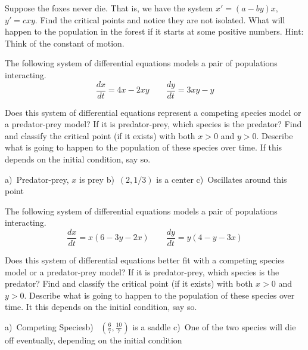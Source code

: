 \begin{exercise}[challenging]\ansMark%
Suppose the foxes never die.  That is, we have the system $x' = (a-by)x,$ $y' = cxy$.
Find the critical points and notice they are not isolated.  
What will happen to the population in the forest if it starts at some
positive numbers.  Hint: Think of the constant of motion.
\end{exercise}

\begin{exercise}
The following system of differential equations models a pair of populations interacting. 
\[ \frac{dx}{dt} = 4x - 2xy \qquad \frac{dy}{dt} = 3xy - y \]
\begin{tasks}
\task Does this system of differential equations represent a competing species model or a predator-prey model? If it is predator-prey, which species is the predator?
\task Find and classify the critical point (if it exists) with both $x>0$ and $y>0$.
\task Describe what is going to happen to the population of these species over time. If this depends on the initial condition, say so.
\end{tasks}
\end{exercise}
\comboSol{%
}
{%
a)~Predator-prey, $x$ is prey \quad b)~$(2, 1/3)$ is a center \quad c)~Oscillates around this point
}

\begin{exercise}
The following system of differential equations models a pair of populations interacting. 
\[ \frac{dx}{dt} = x(6 - 3y - 2x)  \qquad \frac{dy}{dt} = y(4 - y - 3x) \]
\begin{tasks}
\task Does this system of differential equations better fit with a competing species model or a predator-prey model? If it is predator-prey, which species is the predator?
\task Find and classify the critical point (if it exists) with both $x>0$ and $y>0$.
\task Describe what is going to happen to the population of these species over time. It this depends on the initial condition, say so.
\end{tasks}
\end{exercise}
\comboSol{%
}
{%
a)~Competing Species\quad b)~ $\left(\frac{6}{7}, \frac{10}{7}\right)$ is a saddle \quad c)~One of the two species will die off eventually, depending on the initial condition
}

